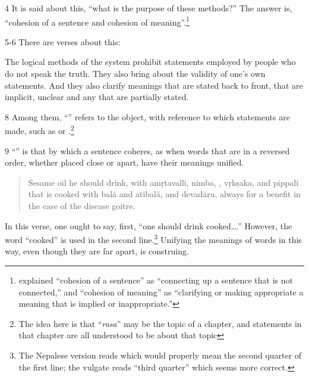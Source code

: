 \begin{translation}
\item [4] It is said about this, “what is the purpose of these methods?”
The answer is, “cohesion of a sentence and cohesion of
meaning”.\footnote{ explained “cohesion of a
    sentence” as “connecting up a sentence that is not connected,” and
    “cohesion of meaning” as “clarifying  or making appropriate a meaning
    that is implied or inappropriate.”}

\item [5-6] There are  verses about this:
  
\begin{sloka}
The logical methods of the system prohibit
statements employed by people who do not speak the truth.
They also bring about the validity of one’s own
statements.  And they also clarify meanings that are stated back to
front, that are implicit, unclear and any that are partially stated.
\end{sloka}

\item [8] Among them, “” refers to the object, with 
reference to which statements are made, such as  or 
.\footnote{The idea here is that “\emph{rasa}” may be the 
topic of a chapter, and statements in that chapter are all understood to be about 
that topic}

\item [9] “” is that by which a sentence
coheres, as when words that are in a reversed order, whether placed close
or apart, have their meanings unified.
\begin{quote}
    Sesame oil he should drink, with 
\gls{amṛtavalli}, 
\gls{nimba},
,
\gls{vṛkṣaka}, and
\gls{pippalī}
\\[2ex]
that is cooked with 
\gls{balā} and \gls{atibalā}, %
and
\gls{devadāru},
always for a benefit in the case of the disease goitre.
\end{quote}
In this verse, one ought to say, first, “one should drink
cooked\ldots.” However, the word “cooked” is used in the second
line.\footnote{The Nepalese version reads  which would
    properly mean the second quarter of the first line; the vulgate reads
    “third quarter” which seems more correct.} Unifying the meanings of words in
    this way, even though they are far apart, is construing. 
 


\end{translation}
